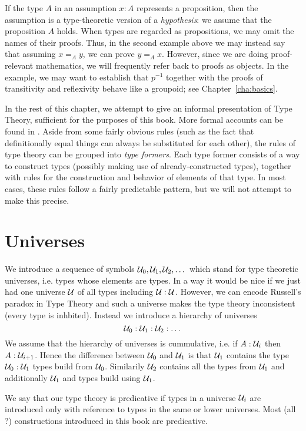 If the type $A$ in an assumption $x:A$ represents a proposition, then the assumption is a type-theoretic version of a \emph{hypothesis}: we assume that the proposition $A$ holds.
When types are regarded as propositions, we may omit the names of their proofs.
Thus, in the second example above we may instead say that assuming $x =_A y$, we can prove $y =_A x$.
However, since we are doing proof-relevant mathematics, we will frequently refer back to proofs as objects.
In the example, we may want to establish that $p^{-1}$ together with the proofs of transitivity and reflexivity behave like a groupoid; see Chapter~\ref{cha:basics}.

In the rest of this chapter, we attempt to give an informal presentation of Type Theory, sufficient for the purposes of this book.
More formal accounts can be found in \cite{hofmann-traktat,...}.
Aside from some fairly obvious rules (such as the fact that definitionally equal things can always be substituted for each other), the rules of type theory can be grouped into \emph{type formers}.
Each type former consists of a way to construct types (possibly making use of already-constructed types), together with rules for the construction and behavior of elements of that type.
In most cases, these rules follow a fairly predictable pattern, but we will not attempt to make this precise.


\section{Universes}
\label{sec:universes}

We introduce a sequence of symbols $\mathcal{U}_0,\mathcal{U}_1,\mathcal{U}_2, \dots$ which
stand for type theoretic universes, i.e. types whose elements are
types. In a way it would be nice if we just had one universe $\mathcal{U}$ of
all types including $\mathcal{U} : \mathcal{U}$. However, we can encode Russell's
paradox in Type Theory and such a universe makes the type theory
inconsistent (every type is inhbited). Instead we introduce a
hierarchy of universes
\[ \mathcal{U}_0 : \mathcal{U}_1 : \mathcal{U}_2 : \dots \]
We assume that the hierarchy of universes is cummulative, i.e. if
$A:\mathcal{U}_i$ then $A : \mathcal{U}_{i+1}$. Hence the difference between
$\mathcal{U}_0$ and $\mathcal{U}_1$ is that $\mathcal{U}_1$ contains the type $\mathcal{U}_0:\mathcal{U}_1$
types build from $\mathcal{U}_0$. Similarily $\mathcal{U}_2$ contains all the types
from $\mathcal{U}_1$ and additionally $\mathcal{U}_1$ and types build using $\mathcal{U}_1$. 

We say that our type theory is predicative if types in a universe
$\mathcal{U}_i$ are introduced only with reference to types in the same or
lower universes. Most (all ?) constructions introduced in this book
are predicative. 

